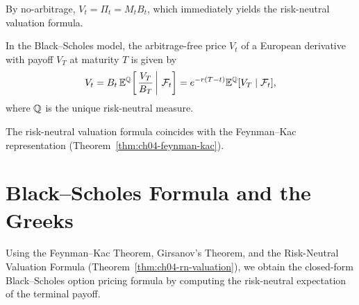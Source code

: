 By no-arbitrage, $V_t = \Pi_t = M_t B_t$, which immediately yields the risk-neutral valuation formula.

\begin{theorem}
    \label{thm:ch04-rn-valuation}
    In the Black--Scholes model, the arbitrage-free price $V_t$ of a European derivative with payoff $V_T$ at maturity $T$ is given by
    \[
        V_t = B_t\,\mathbb{E}^{\mathbb{Q}}\!\left[\left.\frac{V_T}{B_T}\,\right|\,\mathcal{F}_t\right]
        = e^{-r(T-t)}\mathbb{E}^{\mathbb{Q}}[V_T \mid \mathcal{F}_t],
    \]
    where $\mathbb{Q}$ is the unique risk-neutral measure.
\end{theorem}

\begin{note}
    The risk-neutral valuation formula coincides with the Feynman--Kac representation (Theorem~\ref{thm:ch04-feynman-kac}).
\end{note}

\section{Black--Scholes Formula and the Greeks}
\label{sec:ch04-bs-formula}

Using the Feynman--Kac Theorem, Girsanov's Theorem, and the Risk-Neutral Valuation Formula (Theorem~\ref{thm:ch04-rn-valuation}), we obtain the closed-form Black--Scholes option pricing formula by computing the risk-neutral expectation of the terminal payoff.

